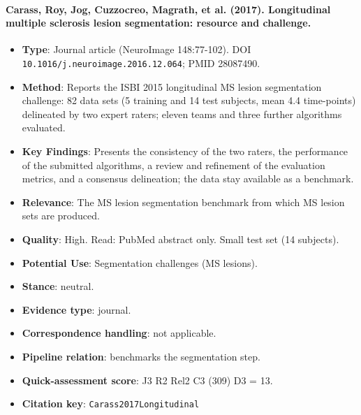 \documentclass[journal,onecolumn]{IEEEtran}
\begin{document}
\paragraph{Carass, Roy, Jog, Cuzzocreo, Magrath, et al. (2017). Longitudinal multiple sclerosis lesion segmentation: resource and challenge.~\cite{Carass2017Longitudinal}}\mbox{}

\begin{itemize}

\item{} \textbf{Type}: Journal article (NeuroImage 148:77-102). DOI \nolinkurl{10.1016/j.neuroimage.2016.12.064}; PMID 28087490.

\item{} \textbf{Method}: Reports the ISBI 2015 longitudinal MS lesion segmentation challenge: 82 data sets (5 training and 14 test subjects, mean 4.4 time-points) delineated by two expert raters; eleven teams and three further algorithms evaluated.

\item{} \textbf{Key Findings}: Presents the consistency of the two raters, the performance of the submitted algorithms, a review and refinement of the evaluation metrics, and a consensus delineation; the data stay available as a benchmark.

\item{} \textbf{Relevance}: The MS lesion segmentation benchmark from which MS lesion sets are produced.

\item{} \textbf{Quality}: High. Read: PubMed abstract only. Small test set (14 subjects).

\item{} \textbf{Potential Use}: Segmentation challenges (MS lesions).

\item{} \textbf{Stance}: neutral.

\item{} \textbf{Evidence type}: journal.

\item{} \textbf{Correspondence handling}: not applicable.

\item{} \textbf{Pipeline relation}: benchmarks the segmentation step.

\item{} \textbf{Quick-assessment score}: J3 R2 Rel2 C3 (309) D3 = 13.

\item{} \textbf{Citation key}: \texttt{Carass2017Longitudinal}

\end{itemize}
\end{document}
